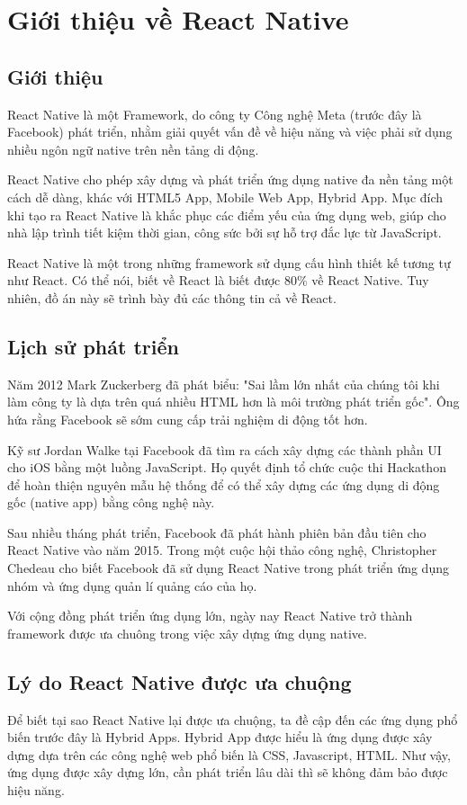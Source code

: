 \section{Giới thiệu về React Native}

\subsection{Giới thiệu}
React Native là một Framework, do công ty Công nghệ Meta (trước đây là Facebook) phát triển, nhằm giải quyết vấn đề về hiệu năng và việc phải sử dụng nhiều ngôn ngữ native trên nền tảng di động.

React Native cho phép xây dựng và phát triển ứng dụng native đa nền tảng một cách dễ dàng, khác với HTML5 App, Mobile Web App, Hybrid App. Mục đích khi tạo ra React Native là khắc phục các điểm yếu của ứng dụng web, giúp cho nhà lập trình tiết kiệm thời gian, công sức bởi sự hỗ trợ đắc lực từ JavaScript.

React Native là một trong những framework sử dụng cấu hình thiết kế tương tự như React. Có thể nói, biết về React là biết được 80\% về React Native. Tuy nhiên, đồ án này sẽ trình bày đủ các thông tin cả về React.

\subsection{Lịch sử phát triển}
Năm 2012 Mark Zuckerberg đã phát biểu: "Sai lầm lớn nhất của chúng tôi khi làm công ty là dựa trên quá nhiều HTML hơn là môi trường phát triển gốc". Ông hứa rằng Facebook sẽ sớm cung cấp trải nghiệm di động tốt hơn.

Kỹ sư Jordan Walke tại Facebook đã tìm ra cách xây dựng các thành phần UI cho iOS bằng một luồng JavaScript. Họ quyết định tổ chức cuộc thi Hackathon để hoàn thiện nguyên mẫu hệ thống để có thể xây dựng các ứng dụng di động gốc (native app) bằng công nghệ này.

Sau nhiều tháng phát triển, Facebook đã phát hành phiên bản đầu tiên cho React Native vào năm 2015. Trong một cuộc hội thảo công nghệ, Christopher Chedeau cho biết Facebook đã sử dụng React Native trong phát triển ứng dụng nhóm và ứng dụng quản lí quảng cáo của họ.

Với cộng đồng phát triển ứng dụng lớn, ngày nay React Native trở thành framework được ưa chuông trong việc xây dựng ứng dụng native.

\subsection{Lý do React Native được ưa chuộng}
Để biết tại sao React Native lại được ưa chuộng, ta đề cập đến các ứng dụng phổ biến trước đây là Hybrid Apps. Hybrid App được hiểu là ứng dụng được xây dựng dựa trên các công nghệ web phổ biến là CSS, Javascript, HTML. Như vậy, ứng dụng được xây dựng lớn, cần phát triển lâu dài thì sẽ không đảm bảo được hiệu năng.

